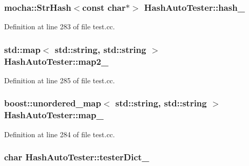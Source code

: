 \hypertarget{class_hash_auto_tester_a6a7806bc0d52aec47e0ae6b535b80fd5}{
\subsubsection[{hash\_\-}]{\setlength{\rightskip}{0pt plus 5cm}mocha::StrHash$<$const char$\ast$$>$ {\bf HashAutoTester::hash\_\-}}}
\label{class_hash_auto_tester_a6a7806bc0d52aec47e0ae6b535b80fd5}


Definition at line 283 of file test.cc.

\hypertarget{class_hash_auto_tester_afc77d5d2a22b98d635cb1051c90baaa1}{
\subsubsection[{map2\_\-}]{\setlength{\rightskip}{0pt plus 5cm}std::map$<$ std::string, std::string $>$ {\bf HashAutoTester::map2\_\-}}}
\label{class_hash_auto_tester_afc77d5d2a22b98d635cb1051c90baaa1}


Definition at line 285 of file test.cc.

\hypertarget{class_hash_auto_tester_a0ed734e4fb32a1b9a7fa3db99000b5af}{
\subsubsection[{map\_\-}]{\setlength{\rightskip}{0pt plus 5cm}boost::unordered\_\-map$<$ std::string, std::string $>$ {\bf HashAutoTester::map\_\-}}}
\label{class_hash_auto_tester_a0ed734e4fb32a1b9a7fa3db99000b5af}


Definition at line 284 of file test.cc.

\hypertarget{class_hash_auto_tester_a502dc4d49d4e41271f7cc1689e011517}{
\subsubsection[{testerDict\_\-}]{\setlength{\rightskip}{0pt plus 5cm}char {\bf HashAutoTester::testerDict\_\-}}}
\label{class_hash_auto_tester_a502dc4d49d4e41271f7cc1689e011517}


